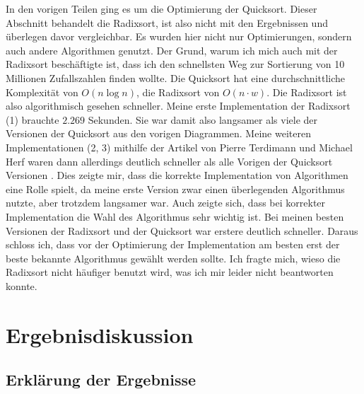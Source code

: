 \documentclass[11pt,a4paper]{article}
\begin{document}
In den vorigen Teilen ging es um die Optimierung der Quicksort. Dieser Abschnitt
behandelt die Radixsort, ist also nicht mit den Ergebnissen und überlegen davor vergleichbar.
Es wurden hier nicht nur Optimierungen, sondern auch andere Algorithmen genutzt.
Der Grund, warum ich mich auch mit der Radixsort beschäftigte ist, dass ich
den schnellsten Weg zur Sortierung von 10 Millionen Zufallszahlen finden wollte.
Die Quicksort hat eine durchschnittliche Komplexität von \boldmath$O(n\log n)$,
die Radixsort von \boldmath$O(n \cdot w)$. Die Radixsort ist also algorithmisch gesehen schneller.
Meine erste Implementation der Radixsort (1) brauchte $2.269$ Sekunden. Sie war damit
also langsamer als viele der Versionen der Quicksort aus den vorigen Diagrammen.
Meine weiteren Implementationen (2, 3) mithilfe der Artikel von Pierre Terdimann und
Michael Herf waren dann allerdings deutlich schneller als alle Vorigen der Quicksort Versionen
\cite{terdiman} \cite{michael}.
Dies zeigte mir, dass die korrekte Implementation von Algorithmen eine Rolle spielt,
da meine erste Version zwar einen überlegenden Algorithmus nutzte, aber trotzdem
langsamer war. Auch zeigte sich, dass bei korrekter Implementation die Wahl des
Algorithmus sehr wichtig ist. Bei meinen besten Versionen der Radixsort und der Quicksort
war erstere deutlich schneller. Daraus schloss ich, dass vor der Optimierung der
Implementation am besten erst der beste bekannte Algorithmus gewählt werden sollte.
Ich fragte mich, wieso die Radixsort nicht häufiger benutzt wird, was ich mir leider nicht
beantworten konnte.

\clearpage

\section{Ergebnisdiskussion}

\subsection{Erklärung der Ergebnisse}
\end{document}
